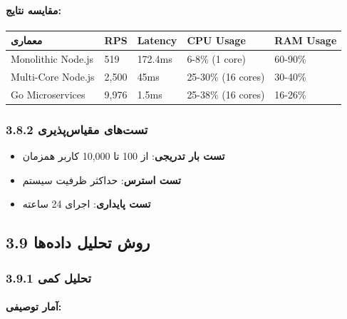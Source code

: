 \documentclass[
]{article}
\newcounter{none} %
\providecommand{\tightlist}{%
  \setlength{\itemsep}{0pt}\setlength{\parskip}{0pt}}
\begin{document}
\paragraph{مقایسه
نتایج:}\label{ux645ux642ux627ux6ccux633ux647-ux646ux62aux627ux6ccux62c}

{\def\LTcaptype{none} %
\begin{longtable}[]{@{}lllll@{}}
\toprule\noalign{}
معماری & RPS & Latency & CPU Usage & RAM Usage \\
\midrule\noalign{}
\endhead
\bottomrule\noalign{}
\endlastfoot
Monolithic Node.js & 519 & 172.4ms & 6-8\% (1 core) & 60-90\% \\
Multi-Core Node.js & 2,500 & 45ms & 25-30\% (16 cores) & 30-40\% \\
Go Microservices & 9,976 & 1.5ms & 25-38\% (16 cores) & 16-26\% \\
\end{longtable}
}

\subsubsection{3.8.2 تست‌های
مقیاس‌پذیری}\label{ux62aux633ux62aux647ux627ux6cc-ux645ux642ux6ccux627ux633ux67eux630ux6ccux631ux6cc}

\begin{itemize}
\tightlist
\item
  \textbf{تست بار تدریجی}: از 100 تا 10,000 کاربر همزمان
\item
  \textbf{تست استرس}: حداکثر ظرفیت سیستم
\item
  \textbf{تست پایداری}: اجرای 24 ساعته
\end{itemize}

\subsection{3.9 روش تحلیل
داده‌ها}\label{ux631ux648ux634-ux62aux62dux644ux6ccux644-ux62fux627ux62fux647ux647ux627}

\subsubsection{3.9.1 تحلیل
کمی}\label{ux62aux62dux644ux6ccux644-ux6a9ux645ux6cc}

\paragraph{آمار
توصیفی:}\label{ux622ux645ux627ux631-ux62aux648ux635ux6ccux641ux6cc}
\end{document}

